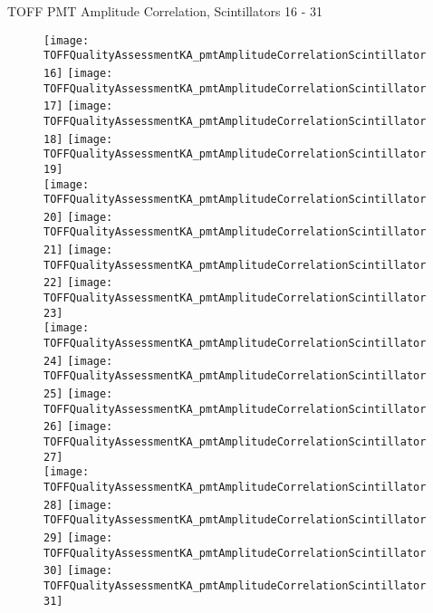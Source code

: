 \documentclass[11pt]{beamer}
\begin{document}
\begin{frame}{TOFF PMT Amplitude Correlation, Scintillators 16 - 31}
\begin{figure}
\centering
\texttt{[image: TOFFQualityAssessmentKA\_pmtAmplitudeCorrelationScintillator16]}
\texttt{[image: TOFFQualityAssessmentKA\_pmtAmplitudeCorrelationScintillator17]}
\texttt{[image: TOFFQualityAssessmentKA\_pmtAmplitudeCorrelationScintillator18]}
\texttt{[image: TOFFQualityAssessmentKA\_pmtAmplitudeCorrelationScintillator19]} \\
\texttt{[image: TOFFQualityAssessmentKA\_pmtAmplitudeCorrelationScintillator20]}
\texttt{[image: TOFFQualityAssessmentKA\_pmtAmplitudeCorrelationScintillator21]}
\texttt{[image: TOFFQualityAssessmentKA\_pmtAmplitudeCorrelationScintillator22]}
\texttt{[image: TOFFQualityAssessmentKA\_pmtAmplitudeCorrelationScintillator23]} \\
\texttt{[image: TOFFQualityAssessmentKA\_pmtAmplitudeCorrelationScintillator24]}
\texttt{[image: TOFFQualityAssessmentKA\_pmtAmplitudeCorrelationScintillator25]}
\texttt{[image: TOFFQualityAssessmentKA\_pmtAmplitudeCorrelationScintillator26]}
\texttt{[image: TOFFQualityAssessmentKA\_pmtAmplitudeCorrelationScintillator27]} \\
\texttt{[image: TOFFQualityAssessmentKA\_pmtAmplitudeCorrelationScintillator28]}
\texttt{[image: TOFFQualityAssessmentKA\_pmtAmplitudeCorrelationScintillator29]}
\texttt{[image: TOFFQualityAssessmentKA\_pmtAmplitudeCorrelationScintillator30]}
\texttt{[image: TOFFQualityAssessmentKA\_pmtAmplitudeCorrelationScintillator31]} \\
\end{figure}
\end{frame}
\end{document}
